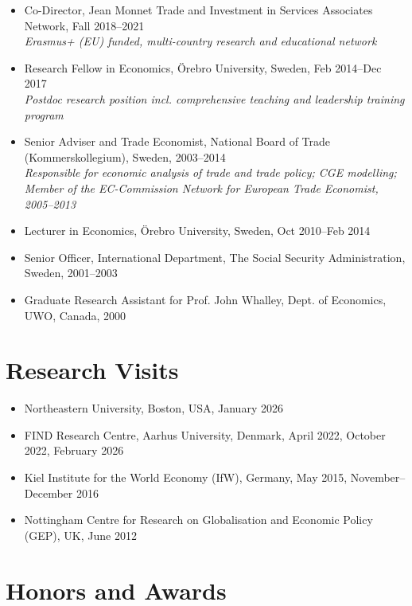 \documentclass[11pt,a4paper]{article}
\newcommand{\cventry}[1]{\item #1}
\begin{document}
\begin{itemize}
 \cventry{Co-Director, Jean Monnet Trade and Investment in Services Associates Network, Fall 2018--2021\\
 \textit{Erasmus+ (EU) funded, multi-country research and educational network}}
 \cventry{Research Fellow in Economics, Örebro University, Sweden, Feb 2014--Dec 2017\\
 \textit{Postdoc research position incl. comprehensive teaching and leadership training program}}
 \cventry{Senior Adviser and Trade Economist, National Board of Trade (Kommerskollegium), Sweden, 2003--2014\\
 \textit{Responsible for economic analysis of trade and trade policy; CGE modelling; Member of the EC-Commission Network for European Trade Economist, 2005--2013}}
 \cventry{Lecturer in Economics, Örebro University, Sweden, Oct 2010--Feb 2014}
 \cventry{Senior Officer, International Department, The Social Security Administration, Sweden, 2001--2003}
 \cventry{Graduate Research Assistant for Prof. John Whalley, Dept. of Economics, UWO, Canada, 2000}
\end{itemize}

\section{Research Visits}

\begin{itemize}
 \cventry{Northeastern University, Boston, USA, January 2026}
 \cventry{FIND Research Centre, Aarhus University, Denmark, April 2022, October 2022, February 2026}
 \cventry{Kiel Institute for the World Economy (IfW), Germany, May 2015, November--December 2016}
 \cventry{Nottingham Centre for Research on Globalisation and Economic Policy (GEP), UK, June 2012}
\end{itemize}

\section{Honors and Awards}
\end{document}
